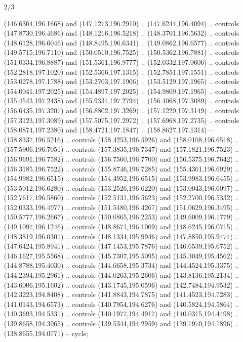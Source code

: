 \begin{flagdescription}{2/3}
\begin{scope}[shift={(0.5\flaglength,0.5)},scale=\flagwidth/320]
\begin{scope}[y=0.8pt, x=0.8pt, yscale=-1,shift={(-118.3,-146)}]
  (146.6304,196.1668) and (147.1273,196.2910) .. (147.6244,196.4094) .. controls
  (147.8730,196.4686) and (148.1216,196.5218) .. (148.3701,196.5632) .. controls
  (148.6128,196.6046) and (148.8495,196.6341) .. (149.0862,196.6577) .. controls
  (149.5715,196.7110) and (150.0510,196.7525) .. (150.5362,196.7881) .. controls
  (151.0334,196.8887) and (151.5361,196.9777) .. (152.0332,197.0606) .. controls
  (152.2818,197.1020) and (152.5366,197.1315) .. (152.7851,197.1551) .. controls
  (153.0278,197.1788) and (153.2703,197.1906) .. (153.5129,197.1965) .. controls
  (154.0041,197.2025) and (154.4897,197.2025) .. (154.9809,197.1965) .. controls
  (155.4543,197.2438) and (155.9334,197.2794) .. (156.4068,197.3089) .. controls
  (156.6435,197.3207) and (156.8802,197.3269) .. (157.1229,197.3149) .. controls
  (157.3123,197.3089) and (157.5075,197.2972) .. (157.6968,197.2735) .. controls
  (158.0874,197.2380) and (158.4721,197.1847) .. (158.8627,197.1314) --
  (158.8337,196.5216) .. controls (158.4253,196.5926) and (158.0108,196.6518) ..
  (157.5906,196.7051) .. controls (157.3835,196.7347) and (157.1821,196.7523) ..
  (156.9691,196.7582) .. controls (156.7560,196.7700) and (156.5375,196.7642) ..
  (156.3185,196.7522) .. controls (155.8746,196.7285) and (155.4361,196.6929) ..
  (154.9982,196.6515) .. controls (154.4952,196.6515) and (153.9983,196.6455) ..
  (153.5012,196.6280) .. controls (153.2526,196.6220) and (153.0043,196.6097) ..
  (152.7617,196.5860) .. controls (152.5131,196.5623) and (152.2700,196.5332) ..
  (152.0333,196.4977) .. controls (151.5480,196.4267) and (151.0629,196.3495) ..
  (150.5777,196.2667) .. controls (150.0865,196.2253) and (149.6009,196.1779) ..
  (149.1097,196.1246) .. controls (148.8671,196.1009) and (148.6245,196.0715) ..
  (148.3819,196.0301) .. controls (148.1334,195.9946) and (147.8850,195.9474) ..
  (147.6424,195.8941) .. controls (147.1453,195.7876) and (146.6539,195.6752) ..
  (146.1627,195.5568) .. controls (145.7307,195.5095) and (145.3049,195.4562) ..
  (144.8788,195.4030) .. controls (144.6658,195.3734) and (144.4524,195.3375) ..
  (144.2394,195.2961) .. controls (144.0263,195.2606) and (143.8136,195.2134) ..
  (143.6006,195.1602) .. controls (143.1745,195.0596) and (142.7484,194.9532) ..
  (142.3223,194.8408) .. controls (141.8843,194.7875) and (141.4523,194.7283) ..
  (141.0143,194.6573) .. controls (140.7954,194.6276) and (140.5824,194.5864) ..
  (140.3693,194.5331) .. controls (140.1977,194.4917) and (140.0315,194.4498) ..
  (139.8658,194.3965) .. controls (139.5344,194.2959) and (139.1970,194.1896) ..
  (138.8655,194.0771) -- cycle;


\end{scope}
\end{scope}
\end{flagdescription}
